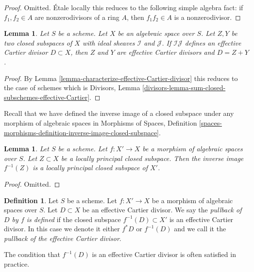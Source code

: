 \documentclass{stacks-project}
\theoremstyle{plain}
\newtheorem{lemma}[subsection]{Lemma}
\theoremstyle{definition}
\newtheorem{definition}[subsection]{Definition}
\theoremstyle{remark}
\numberwithin{equation}{subsection}
\begin{document}
\begin{proof}
Omitted. \'Etale locally this reduces to the following simple
algebra fact: if $f_1, f_2 \in A$ are nonzerodivisors of a ring $A$, then
$f_1f_2 \in A$ is a nonzerodivisor.
\end{proof}

\begin{lemma}
\label{lemma-sum-closed-subschemes-effective-Cartier}
Let $S$ be a scheme. Let $X$ be an algebraic space over $S$.
Let $Z, Y$ be two closed subspaces of $X$
with ideal sheaves $\mathcal{I}$ and $\mathcal{J}$. If $\mathcal{I}\mathcal{J}$
defines an effective Cartier divisor $D \subset X$, then $Z$ and $Y$
are effective Cartier divisors and $D = Z + Y$.
\end{lemma}

\begin{proof}
By Lemma \ref{lemma-characterize-effective-Cartier-divisor}
this reduces to the case of schemes which is
Divisors, Lemma \ref{divisors-lemma-sum-closed-subschemes-effective-Cartier}.
\end{proof}

\noindent
Recall that we have defined the inverse image of a closed subspace
under any morphism of algebraic spaces in
Morphisms of Spaces, Definition
\ref{spaces-morphisms-definition-inverse-image-closed-subspace}.

\begin{lemma}
\label{lemma-pullback-locally-principal}
Let $S$ be a scheme.
Let $f : X' \to X$ be a morphism of algebraic spaces over $S$.
Let $Z \subset X$ be a locally principal closed subspace.
Then the inverse image $f^{-1}(Z)$ is a locally principal closed
subspace of $X'$.
\end{lemma}

\begin{proof}
Omitted.
\end{proof}

\begin{definition}
\label{definition-pullback-effective-Cartier-divisor}
Let $S$ be a scheme.
Let $f : X' \to X$ be a morphism of algebraic spaces over $S$.
Let $D \subset X$
be an effective Cartier divisor. We say the {\it pullback of
$D$ by $f$ is defined} if the closed subspace $f^{-1}(D) \subset X'$
is an effective Cartier divisor. In this case we denote it either
$f^*D$ or $f^{-1}(D)$ and we call it the
{\it pullback of the effective Cartier divisor}.
\end{definition}

\noindent
The condition that $f^{-1}(D)$ is an effective Cartier divisor
is often satisfied in practice.
\end{document}
